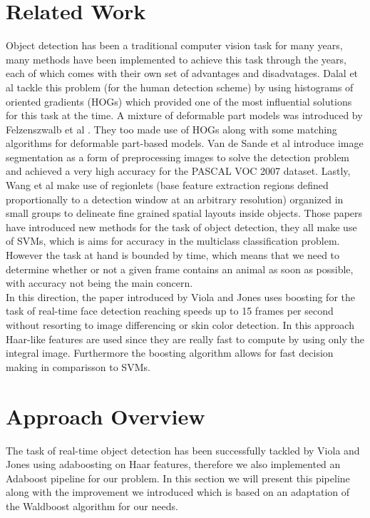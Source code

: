 \documentclass[11pt]{article}
\begin{document}
\section{Related Work}
Object detection has been a traditional computer vision task for many years, many methods have been implemented to achieve this task through the years, each of which comes with their own set of advantages and disadvatages. Dalal et al \cite{dalal2005histograms} tackle this problem (for the human detection scheme) by using histograms of oriented gradients (HOGs) which provided one of the most influential solutions for this task at the time. A mixture of deformable part models was introduced by Felzenszwalb et al \cite{lsvm-pami}. They too made use of HOGs along with some matching algorithms for deformable part-based models. Van de Sande et al \cite{vandeSande:2011:SSS:2355573.2356474} introduce image segmentation as a form of preprocessing images to solve the detection problem and achieved a very high accuracy for the PASCAL VOC 2007 dataset. Lastly, Wang et al \cite{Wang:2013:RGO:2586117.2587017} make use of regionlets (base feature extraction regions defined proportionally to a detection window at an arbitrary resolution) organized in small groups to delineate fine grained spatial layouts inside objects. Those papers have introduced new methods for the task of object detection, they all make use of SVMs, which is aims for accuracy in the multiclass classification problem. However the task at hand is bounded by time, which means that we need to determine whether or not a given frame contains an animal as soon as possible, with accuracy not being the main concern.\\
In this direction, the paper introduced by Viola and Jones \cite{Viola01rapidobject} uses boosting for the task of real-time face detection reaching speeds up to 15 frames per second without resorting to image differencing or skin color detection. In this approach Haar-like features are used since they are really fast to compute by using only the integral image. Furthermore the boosting algorithm allows for fast decision making in comparisson to SVMs.

\section{Approach Overview}
The task of real-time object detection has been successfully tackled by Viola and Jones using adaboosting on Haar features, therefore we also implemented an Adaboost pipeline for our problem. In this section we will present this pipeline along with the improvement we introduced which is based on an adaptation of the Waldboost \cite{Matas05waldboost-} algorithm for our needs.
\end{document}
